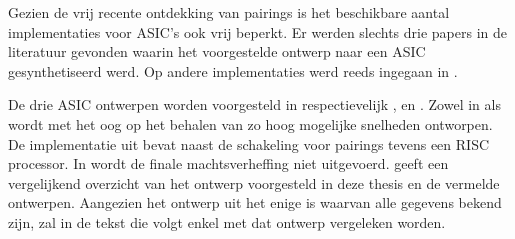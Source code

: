 Gezien de vrij recente ontdekking van pairings is het beschikbare aantal implementaties voor ASIC's ook vrij beperkt. Er werden slechts drie papers in de literatuur gevonden waarin het voorgestelde ontwerp naar een ASIC gesynthetiseerd werd. Op andere implementaties werd reeds ingegaan in .

De drie ASIC ontwerpen worden voorgesteld in respectievelijk \cite{beuchat-asic}, \cite{kammler} en \cite{savas}. Zowel in \cite{beuchat-asic} als \cite{savas} wordt met het oog op het behalen van zo hoog mogelijke snelheden ontworpen. De implementatie uit \cite{kammler} bevat naast de schakeling voor pairings tevens een RISC processor. In \cite{savas} wordt de finale machtsverheffing niet uitgevoerd.  geeft een vergelijkend overzicht van het ontwerp voorgesteld in deze thesis en de vermelde ontwerpen. Aangezien het ontwerp uit \cite{beuchat-asic} het enige is waarvan alle gegevens bekend zijn, zal in de tekst die volgt enkel met dat ontwerp vergeleken worden. 

